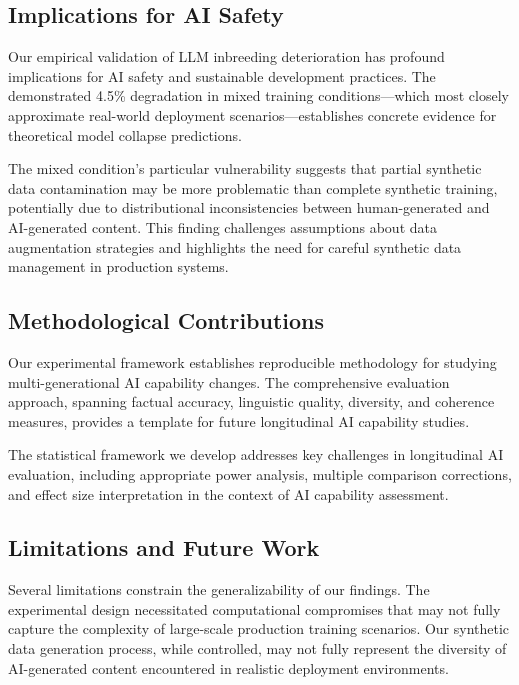 \documentclass{article}
\begin{document}
\subsection{Implications for AI Safety}

Our empirical validation of LLM inbreeding deterioration has profound implications for AI safety and sustainable development practices. The demonstrated 4.5\% degradation in mixed training conditions—which most closely approximate real-world deployment scenarios—establishes concrete evidence for theoretical model collapse predictions.

The mixed condition's particular vulnerability suggests that partial synthetic data contamination may be more problematic than complete synthetic training, potentially due to distributional inconsistencies between human-generated and AI-generated content. This finding challenges assumptions about data augmentation strategies and highlights the need for careful synthetic data management in production systems.

\subsection{Methodological Contributions}

Our experimental framework establishes reproducible methodology for studying multi-generational AI capability changes. The comprehensive evaluation approach, spanning factual accuracy, linguistic quality, diversity, and coherence measures, provides a template for future longitudinal AI capability studies.

The statistical framework we develop addresses key challenges in longitudinal AI evaluation, including appropriate power analysis, multiple comparison corrections, and effect size interpretation in the context of AI capability assessment.

\subsection{Limitations and Future Work}

Several limitations constrain the generalizability of our findings. The experimental design necessitated computational compromises that may not fully capture the complexity of large-scale production training scenarios. Our synthetic data generation process, while controlled, may not fully represent the diversity of AI-generated content encountered in realistic deployment environments.
\end{document}
